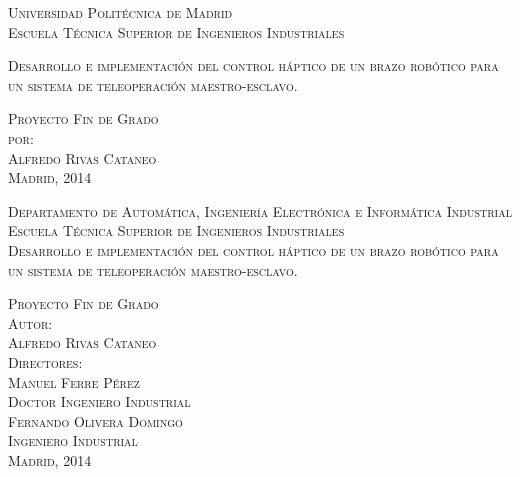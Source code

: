 \begin{center}
\thispagestyle{empty}
\textsc{\huge{Universidad Polit\'ecnica de Madrid\\ }}
\textsc{\Large{Escuela T\'ecnica Superior de Ingenieros Industriales}}
\vspace{1cm}
\vspace{1cm}

\textsc{\large{Desarrollo e implementación del
control háptico de un brazo robótico para un sistema de teleoperación maestro-esclavo.\\
}}

\vspace{3cm}

\textsc{\large{Proyecto Fin de Grado\\ por:\\ }}
\vspace{1cm}
\textsc{Alfredo Rivas Cataneo\\}
\vspace{9cm}
\textsc{\large{Madrid, 2014}}

\end{center}



\newpage
\thispagestyle{empty}
\mbox{}




\newpage
\thispagestyle{empty}
\begin{center}
\textsc{\Large{Departamento de Automática, Ingeniería Electrónica e Informática Industrial\\
Escuela Técnica Superior de Ingenieros Industriales\\}}
\vspace{2cm}
\textsc{\large{Desarrollo e implementación del
control háptico de un brazo robótico para un sistema de teleoperación maestro-esclavo.\\
}}

\vspace{1cm}

\textsc{\large{Proyecto Fin de Grado\\  }}
\vspace{1.5cm}
\textsc{Autor:\\}
\textsc{Alfredo Rivas Cataneo\\}
\vspace{1.5cm}
\textsc{Directores:\\ \vspace{1cm}  Manuel Ferre Pérez\\ Doctor Ingeniero Industrial\\ \vspace{1cm} Fernando Olivera Domingo\\Ingeniero Industrial\\			}
\vspace{5cm}
\textsc{\large{Madrid, 2014}}
\end{center}




